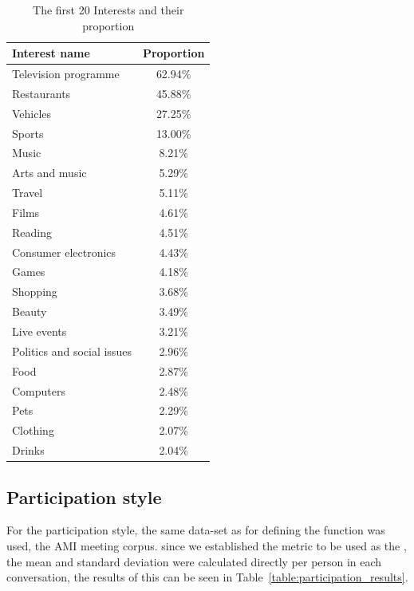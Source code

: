 \begin{table}[]
    \centering
    \begin{tabular}{lc}
    \hline
    Interest name              & Proportion \\
    \hline
    Television programme       & 62.94\%    \\
    Restaurants                & 45.88\%    \\
    Vehicles                   & 27.25\%    \\
    Sports                     & 13.00\%    \\
    Music                      & 8.21\%     \\
    Arts and music             & 5.29\%     \\
    Travel                     & 5.11\%     \\
    Films                      & 4.61\%     \\
    Reading                    & 4.51\%     \\
    Consumer electronics       & 4.43\%     \\
    Games                      & 4.18\%     \\
    Shopping                   & 3.68\%     \\
    Beauty                     & 3.49\%     \\
    Live events                & 3.21\%     \\
    Politics and social issues & 2.96\%     \\
    Food                       & 2.87\%     \\
    Computers                  & 2.48\%     \\
    Pets                       & 2.29\%     \\
    Clothing                   & 2.07\%     \\
    Drinks                     & 2.04\%     \\
    \hline
    \end{tabular}
    \caption{The first 20 Interests and their proportion}
    \label{table:results_interests}
\end{table}

\subsection{Participation style}

For the participation style, the same data-set as for defining the function was used, the AMI meeting corpus. since we established the metric to be used as the , the mean and standard deviation were calculated directly per person in each conversation, the results of this can be seen in Table~\ref{table:participation_results}.\\

